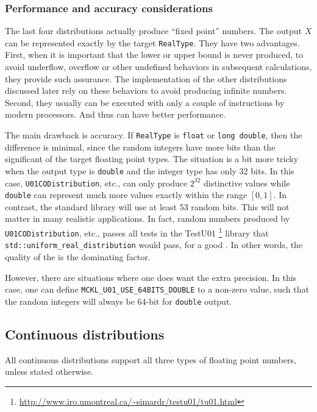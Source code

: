 \subsubsection{Performance and accuracy considerations}

The last four distributions actually produce ``fixed point'' numbers. The
output $X$ can be represented exactly by the target \verb|RealType|. They have
two advantages. First, when it is important that the lower or upper bound is
never produced, to avoid underflow, overflow or other undefined behaviors in
subsequent calculations, they provide such assurance. The implementation of the
other distributions discussed later rely on these behaviors to avoid producing
infinite numbers. Second, they usually can be executed with only a couple of
instructions by modern processors. And thus can have better performance.

The main drawback is accuracy. If \verb|RealType| is \verb|float| or
\verb|long double|, then the difference is minimal, since the random integers
have more bits than the significant of the target floating point types. The
situation is a bit more tricky when the output type is \verb|double| and the
integer type has only 32 bits. In this case, \verb|U01CODistribution|, etc.,
can only produce $2^{32}$ distinctive values while \verb|double| can represent
much more values exactly within the range $[0, 1]$. In contrast, the standard
library will use at least 53 random bits. This will not matter in many
realistic applications. In fact, random numbers produced by
\verb|U01CODistribution|, etc., passes all tests in the {\lnfigures\tbfigures
  TestU01}%
\footnote{\url{http://www.iro.umontreal.ca/~simardr/testu01/tu01.html}} library
that \verb|std::uniform_real_distribution| would pass, for a good \rng. In
other words, the quality of the \rng is the dominating factor.

However, there are situations where one does want the extra precision. In this
case, one can define \verb|MCKL_U01_USE_64BITS_DOUBLE| to a non-zero value,
such that the random integers will always be 64-bit for \verb|double| output.

\subsection{Continuous distributions}
\label{sub:Continuous distributions}

All continuous distributions support all three types of floating point numbers,
unless stated otherwise.

